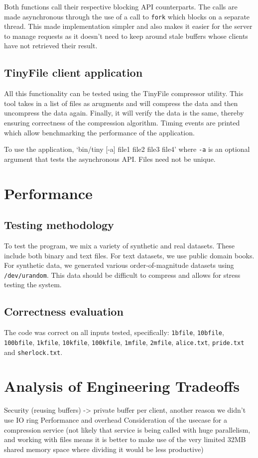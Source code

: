 \documentclass[paper=a4,fontsize=11pt]{report} %
\numberwithin{equation}{section} %
\numberwithin{figure}{section} %
\numberwithin{table}{section} %
\begin{document}
Both functions call their respective blocking API counterparts. The calls are made asynchronous through the use of a call to \texttt{fork} which blocks on a separate thread. This made implementation simpler and also makes it easier for the server to manage requests as it doesn't need to keep around stale buffers whose clients have not retrieved their result.


\subsection{TinyFile client application}

All this functionality can be tested using the TinyFile compressor utility. This tool takes in a list of files as arugments and will compress the data and then uncompress the data again. Finally, it will verify the data is the same, thereby ensuring correctness of the compression algorithm. Timing events are printed which allow benchmarking the performance of the application.

To use the application, `bin/tiny [-a] file1 file2 file3 file4' where \texttt{-a} is an optional argument that tests the asynchronous API. Files need not be unique.

\section{Performance}

\subsection{Testing methodology}
To test the program, we mix a variety of synthetic and real datasets. These include both binary and text files. For text datasets, we use public domain books. For synthetic data, we generated various order-of-magnitude datasets using \texttt{/dev/urandom}. This data should be difficult to compress and allows for stress testing the system.

\subsection{Correctness evaluation}

The code was correct on all inputs tested, specifically: \texttt{1bfile}, \texttt{10bfile}, \texttt{100bfile}, \texttt{1kfile}, \texttt{10kfile}, \texttt{100kfile}, \texttt{1mfile}, \texttt{2mfile}, \texttt{alice.txt}, \texttt{pride.txt} and \texttt{sherlock.txt}.




\section{Analysis of Engineering Tradeoffs}

Security (reusing buffers) -> private buffer per client, another reason we didn't use IO ring
Performance and overhead
Consideration of the usecase for a compression service (not likely that service is being called with huge parallelism, and working with files means it is better to make use of the very limited 32MB shared memory space where dividing it would be less productive)
\end{document}
